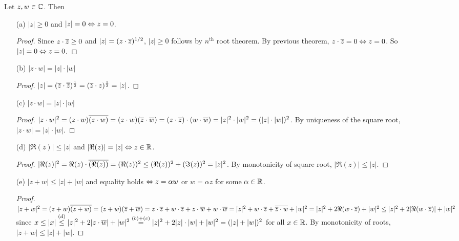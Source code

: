 \documentclass[]{article}
\begin{document}
\begin{theorem}
	Let $z,w\in\mathbb{C}$. Then
	\begin{enumerate}
		\item[(a)] $|z|\geq 0$ and $|z|= 0 \Leftrightarrow z= 0$.
		\begin{proof}
			Since $z\cdot \overline{z} \geq 0$ and $|z| = (z\cdot\overline{z})^{1/2}$, $|z|\geq 0$ follows by $n^\text{th}$ root theorem. By previous theorem, $z\cdot \overline{z} = 0\Leftrightarrow z = 0$. So $|z|=0\Leftrightarrow z = 0$.
		\end{proof}
		\item[(b)] $|z\cdot w| = |z|\cdot |w|$
		\begin{proof}
			$|z| = (\overline{z}\cdot \overline{\overline{z}})^\frac{1}{2} = (\overline{z}\cdot z)^\frac{1}{2} = |z|$.
		\end{proof}
		\item[(c)] $|z\cdot w| = |z|\cdot|w|$
		\begin{proof}
			$|z\cdot w|^2 = (z\cdot w)\overline{(z\cdot w)} = (z\cdot w)(\overline{z}\cdot \overline{w}) = (z\cdot \overline{z})\cdot(w\cdot\overline{w}) = |z|^2\cdot |w|^2 = (|z|\cdot|w|)^2$. By uniqueness of the square root, $|z\cdot w| = |z|\cdot |w|$. 
		\end{proof}
		\item[(d)] $|\Re (z)| \leq |z|$ and $|\Re(z)|=|z|\Leftrightarrow z\in\mathbb{R}$.
		\begin{proof}
			$|\Re(z)|^2 = \Re(z)\cdot \overline{(\Re(z))} = (\Re(z))^2 \leq (\Re(z))^2 + (\Im(z))^2 = |z|^2$. By monotonicity of square root, $|\Re(z)|\leq |z|$.
		\end{proof}
		\item[(e)] $|z+w|\leq |z|+|w|$ and equality holds $\Leftrightarrow z = \alpha w$ or $w = \alpha z$ for some $\alpha\in\mathbb{R}$.
		\begin{proof}
			$|z+w|^2 = (z+w)\overline{(z+w)} = (z+w)(\overline{z}+\overline{w}) = z\cdot \overline{z} + w\cdot \overline{z} + z\cdot \overline{w} + w\cdot\overline{w} = |z|^2 + w\cdot\overline{z} + \overline{\overline{z} \cdot w} + |w|^2 = |z|^2 + 2\Re(w\cdot \overline{z}) + |w|^2 \leq |z|^2 + 2|\Re(w\cdot \overline{z})| + |w|^2$ since $x\leq |x| \overset{(d)}{\leq} |z|^2 + 2|z\cdot\overline{w}| + |w|^2 \overset{(b)+(c)}{=} |z|^2 + 2|z|\cdot|w| + |w|^2 = (|z|+|w|)^2$ for all $x\in\mathbb{R}$. By monotonicity of roots, $|z+w| \leq |z| + |w|$.
		\end{proof}
	\end{enumerate}
\end{theorem}
\end{document}
